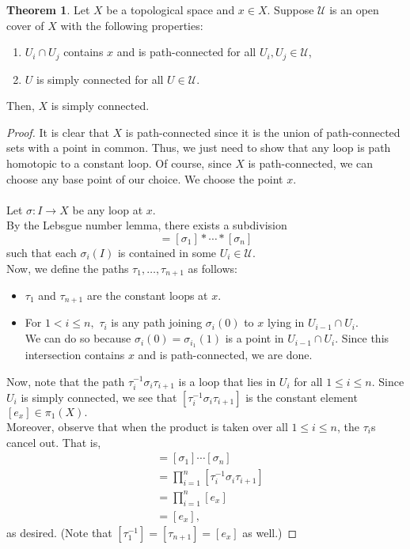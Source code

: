 \documentclass[12pt]{article}
\theoremstyle{definition}
\newtheorem{thm}{Theorem}
\numberwithin{thm}{section}
\begin{document}
\begin{thm}
	Let $X$ be a topological space and $x \in X.$ Suppose $\mathcal{U}$ is an open cover of $X$ with the following properties:
	\begin{enumerate}
		\item $U_i \cap U_j$ contains $x$ and is path-connected for all $U_i, U_j \in \mathcal{U}$,
		\item $U$ is simply connected for all $U \in \mathcal{U}.$
	\end{enumerate}
	Then, $X$ is simply connected.
\end{thm}
\begin{proof} 
	It is clear that $X$ is path-connected since it is the union of path-connected sets with a point in common. Thus, we just need to show that any loop is path homotopic to a constant loop. Of course, since $X$ is path-connected, we can choose any base point of our choice. We choose the point $x.$ \\~\\
	Let $\sigma:I \to X$ be any loop at $x.$\\
	By the Lebsgue number lemma, there exists a subdivision
	\begin{equation*} 
		[\sigma] = [\sigma_1]*\cdots*[\sigma_n]
	\end{equation*}
	such that each $\sigma_i(I)$ is contained in some $U_i \in \mathcal{U}.$ \\
	Now, we define the paths $\tau_1, \ldots, \tau_{n+1}$ as follows:
	\begin{itemize}
		\item $\tau_1$ and $\tau_{n+1}$ are the constant loops at $x.$
		\item For $1 < i \le n,$ $\tau_i$ is any path joining $\sigma_i(0)$ to $x$ lying in $U_{i-1} \cap U_i.$ \\
		We can do so because $\sigma_i(0) = \sigma_{i_1}(1)$ is a point in $U_{i-1} \cap U_i.$ Since this intersection contains $x$ and is path-connected, we are done.
	\end{itemize}
	Now, note that the path $\tau_i^{-1}\sigma_i\tau_{i+1}$ is a loop that lies in $U_i$ for all $1 \le i \le n.$ Since $U_i$ is simply connected, we see that $[\tau_i^{-1}\sigma_i\tau_{i+1}]$ is the constant element $[e_{x}] \in \pi_1(X).$\\
	Moreover, observe that when the product is taken over all $1 \le i \le n$, the $\tau_i$s cancel out. That is,
	\begin{align*} 
		[\sigma] &= [\sigma_1]\cdots[\sigma_n]\\
		&= \prod_{i = 1}^{n}[\tau_i^{-1}\sigma_i\tau_{i+1}]\\
		&= \prod_{i = 1}^{n}[e_x]\\
		&= [e_x],
	\end{align*}
	as desired. (Note that $[\tau_1^{-1}] = [\tau_{n+1}] = [e_x]$ as well.)
\end{proof}
\end{document}
